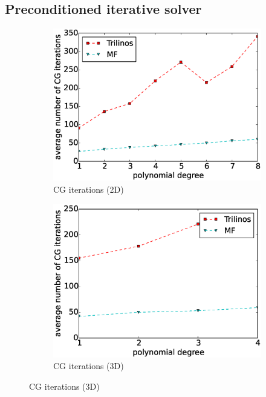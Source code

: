 \documentclass[times,doublespace]{nmeauth}
\begin{document}
\subsection{Preconditioned iterative solver}

\begin{figure}[!ht]
  \begin{subfigure}[b]{0.49\textwidth}
    \centering
    \includegraphics[width=\textwidth]{Emmy_RRZE_cg2d.eps}
    \caption{CG iterations (2D)}
    \label{fig:benchmark_miehe_Emmy_cg2}
  \end{subfigure}
  \begin{subfigure}[b]{0.49\textwidth}
    \centering
    \includegraphics[width=\textwidth]{Emmy_RRZE_cg3d.eps}
    \caption{CG iterations (3D)}

\end{subfigure}
\end{figure}
\end{document}

